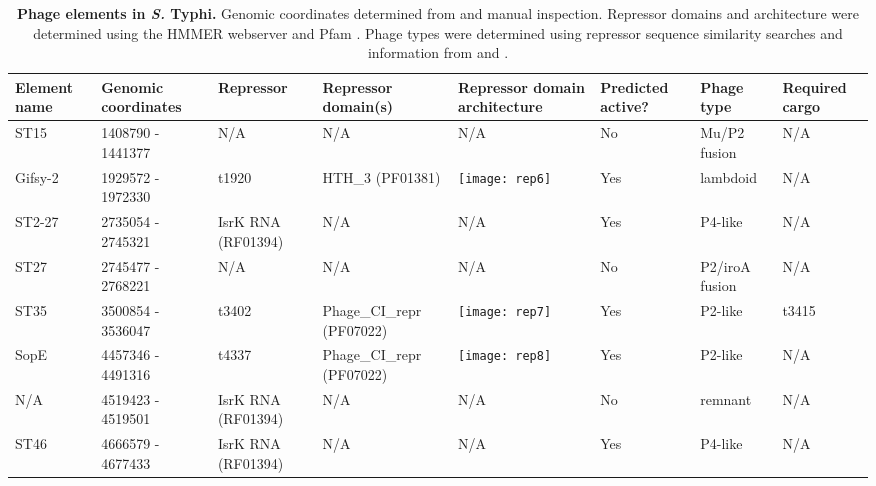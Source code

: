 %
\begin{table}
   \tiny
   \centering
   \noindent
    \caption[Phage elements in \textit{S.} Typhi]{\textbf{Phage elements in \emph{S.} Typhi.} Genomic coordinates determined from \textcite{Thomson2004} and manual inspection. Repressor domains and architecture were determined using the HMMER webserver \parencite{Finn2011} and Pfam \parencite{Punta2012}. Phage types were determined using repressor sequence similarity searches and information from \textcite{Thomson2004} and \textcite{Kropinski2007}. }
    \begin{tabular}{     m{0.5in}
    				m{0.4in}
				m{0.4in}
				m{0.6in}
				m{1.6in}
				m{0.4in}
				m{0.5in}
				m{0.5in}
				}
   
    \\
     \toprule
    \textbf{Element name} & \textbf{Genomic coordinates} & \textbf{Repressor} & \textbf{Repressor domain(s)} & \textbf{Repressor domain architecture} & \textbf{Predicted active?} & \textbf{Phage type} & \textbf{Required cargo} \\
    \midrule
    ST15  & 1408790 - 1441377 & N/A   & N/A   & N/A   & No    & Mu/P2 fusion & N/A \\
    Gifsy-2 & 1929572 - 1972330 & t1920 & HTH\_3 (PF01381) &    \texttt{[image: rep6]}   & Yes   & lambdoid & N/A \\
    ST2-27 & 2735054 - 2745321 & IsrK RNA (RF01394) & N/A   & N/A   & Yes   & P4-like & N/A \\
    ST27  & 2745477 - 2768221 & N/A   & N/A   & N/A   & No    & P2/iroA fusion & N/A \\
    ST35  & 3500854 - 3536047 & t3402 & Phage\_CI\_repr (PF07022) &   \texttt{[image: rep7]}    & Yes   & P2-like & t3415 \\
    SopE  & 4457346 - 4491316 & t4337 & Phage\_CI\_repr (PF07022) &   \texttt{[image: rep8]}    & Yes   & P2-like & N/A \\
    N/A   & 4519423 - 4519501 & IsrK RNA (RF01394) & N/A   & N/A   & No    & remnant & N/A \\
    ST46  & 4666579 - 4677433 & IsrK RNA (RF01394) & N/A   & N/A   & Yes   & P4-like & N/A \\
    \bottomrule
    \end{tabular}%
    \label{tab:ty_phage}%
\end{table}

